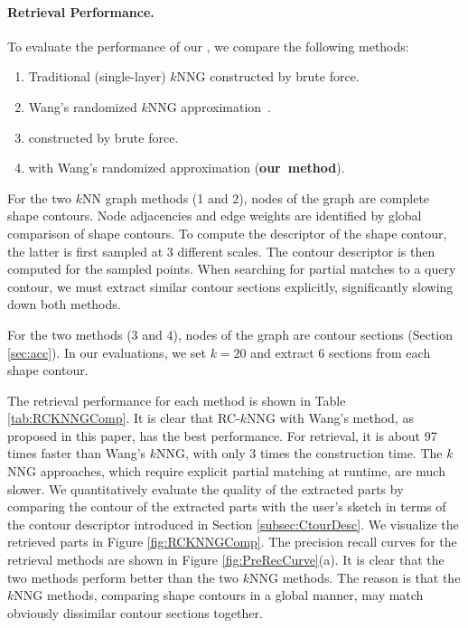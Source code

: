 \paragraph*{{\RCKNNG} Retrieval Performance.} To evaluate the performance of our {\RCKNNG}, we compare the following methods:
\begin{enumerate}
\setlength{\itemsep}{3pt}
\setlength{\parskip}{0pt}
\setlength{\parsep}{0pt}
\item Traditional (single-layer) $k$NNG constructed by brute force.
\item Wang's randomized $k$NNG approximation~\cite{scalableknnjingwangcvpr2012}.
\item {\RCKNNG} constructed by brute force.
\item {\RCKNNG} with Wang's randomized approximation (\mbox{\textbf{our method}}).
\end{enumerate}
For the two $k$NN graph methods (1 and 2), nodes of the graph are complete shape contours. Node adjacencies and edge weights are identified by global comparison of shape contours. To compute the descriptor of the shape contour, the latter is first sampled at 3 different scales. The contour descriptor is then computed for the sampled points. When searching for partial matches to a query contour, we must extract similar contour sections explicitly, significantly slowing down both methods.

For the two {\RCKNNG} methods (3 and 4), nodes of the graph are contour sections (Section \ref{sec:acc}). In our evaluations, we set $k = 20$  and extract $6$ sections from each shape contour.

The retrieval performance for each method is shown in Table \ref{tab:RCKNNGComp}. It is clear that RC-$k$NNG with Wang's method, as proposed in this paper, has the best performance. For retrieval, it is about 97 times faster than Wang's $k$NNG, with only 3 times the construction time. The $k$NNG approaches, which require explicit partial matching at runtime, are much slower. We quantitatively evaluate the quality of the extracted parts by comparing the contour of the extracted parts with the user's sketch in terms of the contour descriptor introduced in Section \ref{subsec:CtourDesc}. We visualize the retrieved parts in Figure \ref{fig:RCKNNGComp}. The precision recall curves for the retrieval methods are shown in Figure \ref{fig:PreRecCurve}(a). It is clear that the two {\RCKNNG} methods perform better than the two $k$NNG methods. The reason is that the $k$NNG methods, comparing shape contours in a global manner, may match obviously dissimilar contour sections together.

